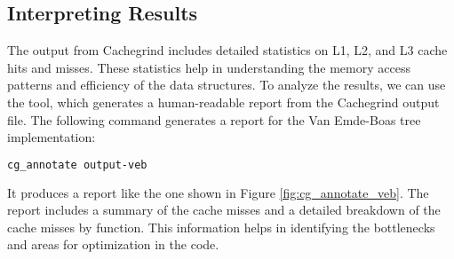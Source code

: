 \subsection{Interpreting Results}

The output from Cachegrind includes detailed statistics on L1, L2, and L3 cache hits and misses. These statistics help in understanding the memory access patterns and efficiency of the data structures. To analyze the results, we can use the  tool, which generates a human-readable report from the Cachegrind output file. The following command generates a report for the Van Emde-Boas tree implementation:
\begin{lstlisting}[language=bash]
cg_annotate output-veb
\end{lstlisting}

It produces a report like the one shown in Figure \ref{fig:cg_annotate_veb}. The report includes a summary of the cache misses and a detailed breakdown of the cache misses by function. This information helps in identifying the bottlenecks and areas for optimization in the code.